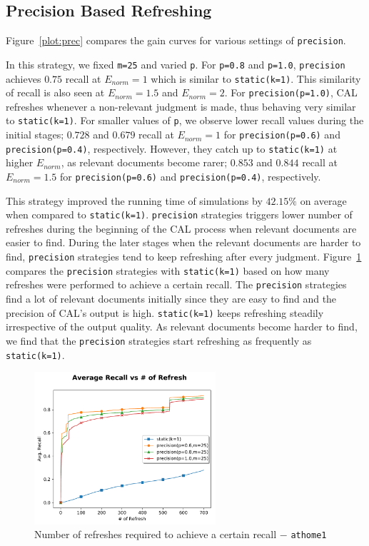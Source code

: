 \subsection*{Precision Based Refreshing}

Figure~\ref{plot:prec} compares the gain curves for
various settings of \texttt{precision}.

In this strategy, we fixed \texttt{m=25} and varied \texttt{p}. For
\texttt{p=0.8} and \texttt{p=1.0}, \texttt{precision} achieves $0.75$ recall at
$E_{norm} = 1$ which is similar to \texttt{static(k=1)}. This
similarity of recall is also seen at $E_{norm} = 1.5$ and $E_{norm} = 2$. For
\texttt{precision(p=1.0)}, CAL refreshes whenever a non-relevant judgment
is made, thus behaving very similar to \texttt{static(k=1)}. For
smaller values of \texttt{p}, we observe lower recall values during the initial stages; 
$0.728$ and $0.679$ recall at $E_{norm} = 1$ for \texttt{precision(p=0.6)} and
\texttt{precision(p=0.4)}, respectively. However, they catch up to
\texttt{static(k=1)} at higher $E_{norm}$, as relevant documents
become rarer; $0.853$ and $0.844$ recall at $E_{norm} = 1.5$ for
\texttt{precision(p=0.6)} and \texttt{precision(p=0.4)}, respectively.

This strategy improved the running time of simulations by $42.15\%$
on average when compared to \texttt{static(k=1)}.
\texttt{precision} strategies triggers lower number of refreshes during the
beginning of the CAL process when relevant documents are easier to find. During
the later stages when the relevant documents are harder to find,
\texttt{precision} strategies tend to keep refreshing after every judgment.
Figure~\ref{plot:prec2} compares the \texttt{precision} strategies with
\texttt{static(k=1)} based on how many refreshes were performed to achieve a
certain recall. The \texttt{precision} strategies find a lot of relevant
documents initially since they are easy to find and the precision of CAL's
output is high. \texttt{static(k=1)} keeps refreshing steadily irrespective of
the output quality. As relevant documents become harder to find, we find that
the \texttt{precision} strategies start refreshing as frequently as
\texttt{static(k=1)}.

\begin{figure}
    \centering
    \includegraphics[width=0.6\textwidth]{plots/prec2.pdf}
    \caption{Number of refreshes required to achieve a certain recall $-$
    \texttt{athome1}}
    \label{plot:prec2}
\end{figure}


